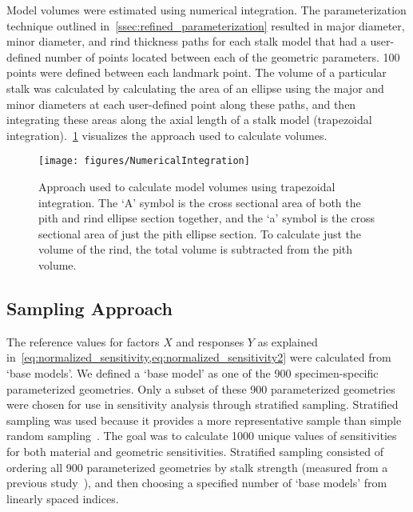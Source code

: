 Model volumes were estimated using numerical integration. The parameterization technique outlined in~\cref{ssec:refined_parameterization} resulted in major diameter, minor diameter, and rind thickness paths for each stalk model that had a user-defined number of points located between each of the geometric parameters. 100 points were defined between each landmark point. The volume of a particular stalk was calculated by calculating the area of an ellipse using the major and minor diameters at each user-defined point along these paths, and then integrating these areas along the axial length of a stalk model (trapezoidal integration).~\cref{fig:NumericalIntegration} visualizes the approach used to calculate volumes.
\newline
\newline

\begin{figure}[htbp]
	\centering
	\texttt{[image: figures/NumericalIntegration]}
	\caption[Approach used to calculate model volumes using trapezoidal integration.]{Approach used to calculate model volumes using trapezoidal integration. The ‘A’ symbol is the cross sectional area of both the pith and rind ellipse section together, and the ‘a’ symbol is the cross sectional area of just the pith ellipse section. To calculate just the volume of the rind, the total volume is subtracted from the pith volume.}
	\label{fig:NumericalIntegration}
\end{figure}

\subsection{Sampling Approach}
\label{ssec:sampling_approach}
The reference values for factors ${X}$ and responses ${Y}$ as explained in~\cref{eq:normalized_sensitivity,eq:normalized_sensitivity2} were calculated from ‘base models’. We defined a ‘base model’ as one of the 900 specimen-specific parameterized geometries. Only a subset of these 900 parameterized geometries were chosen for use in sensitivity analysis through stratified sampling. Stratified sampling was used because it provides a more representative sample than simple random sampling~. The goal was to calculate 1000 unique values of sensitivities for both material and geometric sensitivities. Stratified sampling consisted of ordering all 900 parameterized geometries by stalk strength (measured from a previous study~), and then choosing a specified number of ‘base models’ from linearly spaced indices.

